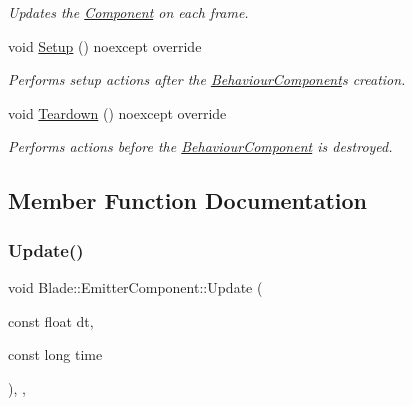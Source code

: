 \begin{DoxyCompactItemize}
\begin{DoxyCompactList}\small\item\em Updates the \hyperlink{class_blade_1_1_component}{Component} on each frame. \end{DoxyCompactList}\item 
\mbox{\label{class_blade_1_1_emitter_component_a996bcbc1a5869b1b1bbf1e7a4124b1ed}} 
void \hyperlink{class_blade_1_1_emitter_component_a996bcbc1a5869b1b1bbf1e7a4124b1ed}{Setup} () noexcept override
\begin{DoxyCompactList}\small\item\em Performs setup actions after the \hyperlink{class_blade_1_1_behaviour_component}{Behaviour\+Component}\textquotesingle{}s creation. \end{DoxyCompactList}\item 
\mbox{\label{class_blade_1_1_emitter_component_a434f1134ef21f15a6839c6e66b282fd3}} 
void \hyperlink{class_blade_1_1_emitter_component_a434f1134ef21f15a6839c6e66b282fd3}{Teardown} () noexcept override
\begin{DoxyCompactList}\small\item\em Performs actions before the \hyperlink{class_blade_1_1_behaviour_component}{Behaviour\+Component} is destroyed. \end{DoxyCompactList}\end{DoxyCompactItemize}


\subsection{Member Function Documentation}
\mbox{\label{class_blade_1_1_emitter_component_ac9fe8dec74fec5c575b960cc9d1411ac}} 
\subsubsection{\texorpdfstring{Update()}{Update()}}
{\footnotesize\ttfamily void Blade\+::\+Emitter\+Component\+::\+Update (\begin{DoxyParamCaption}\item[{const float}]{dt,  }\item[{const long}]{time }\end{DoxyParamCaption})\hspace{0.3cm}{\ttfamily [override]}, {\ttfamily [virtual]}, {\ttfamily [noexcept]}}



